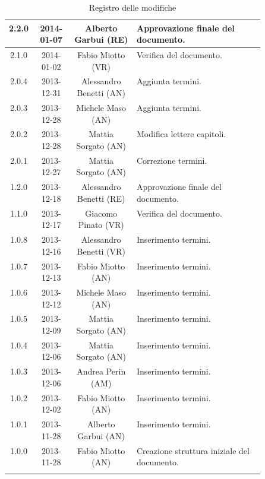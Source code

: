 \begin{center}
\begin{longtable}{|c|c|c|p{0.5\linewidth}|}
\midrule
2.2.0 & 2014-01-07 & Alberto Garbui (RE) & Approvazione finale del documento.\\
\midrule
2.1.0 & 2014-01-02 & Fabio Miotto (VR) & Verifica del documento.\\
\midrule
2.0.4 & 2013-12-31 & Alessandro Benetti (AN) & Aggiunta termini.\\
\midrule
2.0.3 & 2013-12-28 & Michele Maso (AN) & Aggiunta termini.\\
\midrule
2.0.2 & 2013-12-28 & Mattia Sorgato (AN) & Modifica lettere capitoli.\\
\midrule
2.0.1 & 2013-12-27 & Mattia Sorgato (AN) & Correzione termini.\\

\midrule
1.2.0 & 2013-12-18 & Alessandro Benetti (RE) & Approvazione finale del documento.\\
\midrule
1.1.0 & 2013-12-17 & Giacomo Pinato (VR) & Verifica del documento. \\
\midrule
1.0.8 & 2013-12-16 & Alessandro Benetti (VR) & Inserimento termini.\\
\midrule
1.0.7 & 2013-12-13 & Fabio Miotto (AN) & Inserimento termini.\\
\midrule
1.0.6 & 2013-12-12 & Michele Maso (AN) & Inserimento termini.\\
\midrule
1.0.5 & 2013-12-09 & Mattia Sorgato (AN) & Inserimento termini.\\
\midrule
1.0.4 & 2013-12-06 & Mattia Sorgato (AN) & Inserimento termini. \\
\midrule
1.0.3 & 2013-12-06 & Andrea Perin (AM) & Inserimento termini.\\
\midrule
1.0.2 & 2013-12-02 & Fabio Miotto (AN) & Inserimento termini.\\
\midrule
1.0.1 & 2013-11-28 & Alberto Garbui (AN) & Inserimento termini.\\
\midrule
1.0.0 & 2013-11-28 & Fabio Miotto (AN) & Creazione struttura iniziale del documento.\\


\bottomrule
\caption{Registro delle modifiche}
\label{tab:changelog}
\end{longtable}
\end{center}


\newpage






